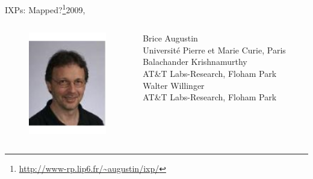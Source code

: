 \documentclass[ngerman,compress,hyperref={bookmarks}]{beamer}
\begin{document}
\begin{frame}{IXPs: Mapped?\footnote{\url{http://www-rp.lip6.fr/~augustin/ixp/}}}{2009, \cite{Augustin:2009:IM:1644893.1644934}}
\begin{columns}[c]
\begin{column}{0.1\textwidth}
\begin{figure}
        \includegraphics[width=1\textwidth]{images/willinger_w}
      \end{figure}
    \end{column}
    \begin{column}{0.3\textwidth}
      {\scriptsize Brice Augustin\\
      \vspace{0.1cm}
      Université Pierre et Marie Curie, Paris\\
      \vspace{0.5cm}
      Balachander Krishnamurthy\\
      \vspace{0.1cm}
      AT\&T Labs-Research, Floham Park\\
      \vspace{0.3cm}
      Walter Willinger\\
      \vspace{0.1cm}
      AT\&T Labs-Research, Floham Park\\ }
    \end{column}
  \end{columns}
\end{frame}
\end{document}
